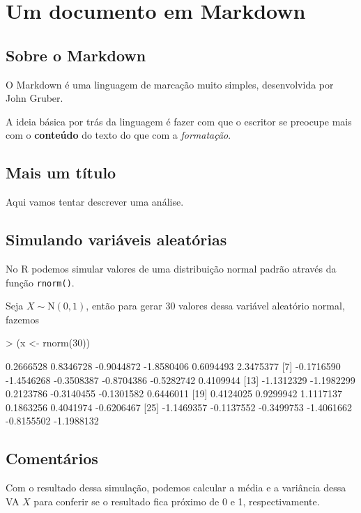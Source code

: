\documentclass{article}
\begin{document}
\section{Um documento em Markdown}

\subsection{Sobre o Markdown}

O Markdown é uma linguagem de marcação muito simples, desenvolvida por
John Gruber.

A ideia básica por trás da linguagem é fazer com que o escritor se
preocupe mais com o \textbf{conteúdo} do texto do que com a
\emph{formatação}.

\subsection{Mais um título}

Aqui vamos tentar descrever uma análise.

\subsection{Simulando variáveis aleatórias}

No R podemos simular valores de uma distribuição normal padrão através
da função \texttt{rnorm()}.

Seja $X \sim \text{N}(0,1)$, então para gerar 30 valores dessa
variável aleatório normal, fazemos

\begin{Schunk}
\begin{Sinput}
> (x <- rnorm(30))
\end{Sinput}
\begin{Soutput}
 [1]  0.2666528  0.8346728 -0.9044872 -1.8580406  0.6094493  2.3475377
 [7] -0.1716590 -1.4546268 -0.3508387 -0.8704386 -0.5282742  0.4109944
[13] -1.1312329 -1.1982299  0.2123786 -0.3140455 -0.1301582  0.6446011
[19]  0.4124025  0.9299942  1.1117137  0.1863256  0.4041974 -0.6206467
[25] -1.1469357 -0.1137552 -0.3499753 -1.4061662 -0.8155502 -1.1988132
\end{Soutput}
\end{Schunk}

\subsection{Comentários}

Com o resultado dessa simulação, podemos calcular a média e a variância
dessa VA $X$ para conferir se o resultado fica próximo de 0 e 1,
respectivamente.
\end{document}
